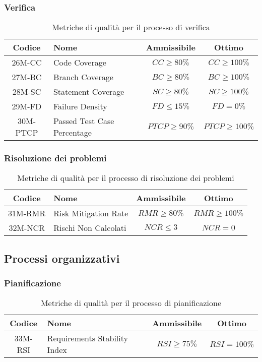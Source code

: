 \subsubsection{Verifica}
\begin{table}[h!]
	\centering
	\begin{tabular}{ | c | l | c | c | }
		\hline
		Codice   & Nome                        & Ammissibile      & Ottimo            \\
		\hline
		26M-CC   & Code Coverage               & $CC \geq 80\%$   & $CC \geq 100\%$   \\
		27M-BC   & Branch Coverage             & $BC \geq 80\%$   & $BC \geq 100\%$   \\
		28M-SC   & Statement Coverage          & $SC \geq 80\%$   & $SC \geq 100\%$   \\
		29M-FD   & Failure Density             & $FD \leq 15\%$   & $FD = 0\%$        \\
		30M-PTCP & Passed Test Case Percentage & $PTCP \geq 90\%$ & $PTCP \geq 100\%$ \\
		\hline
	\end{tabular}
	\caption{Metriche di qualità per il processo di verifica}
\end{table}

\newpage
\subsubsection{Risoluzione dei problemi}
\begin{table}[h!]
	\centering
	\begin{tabular}{ | c | l | c | c | }
		\hline
		Codice   & Nome                 & Ammissibile     & Ottimo           \\
		\hline
		31M-RMR  & Risk Mitigation Rate	& $RMR \geq 80\%$ & $RMR \geq 100\%$ \\
		32M-NCR  & Rischi Non Calcolati	& $NCR \leq 3$    & $NCR = 0$        \\
		\hline
	\end{tabular}
	\caption{Metriche di qualità per il processo di risoluzione dei problemi}
\end{table}

\subsection{Processi organizzativi}
\subsubsection{Pianificazione}
\begin{table}[h!]
	\centering
	\begin{tabular}{ | c | l | c | c | }
		\hline
		Codice   & Nome                         & Ammissibile    & Ottimo       \\
		\hline
		33M-RSI  & Requirements Stability Index & $RSI \geq 75\%$ & $RSI = 100\%$ \\
		\hline
	\end{tabular}
	\caption{Metriche di qualità per il processo di pianificazione}
\end{table}
